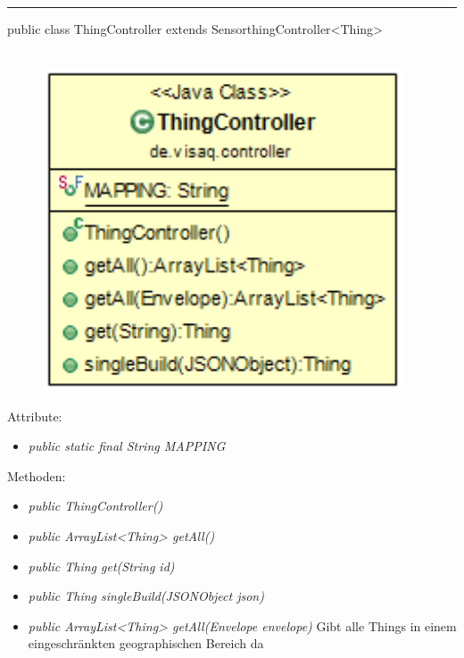 \rule{\textwidth}{0.4pt}
public class ThingController extends SensorthingController<Thing>
\\\\
\begin{minipage}{0.3\textwidth}
    \begin{figure}[H]
        {\centering\includegraphics[width=0.95\textwidth]{media/backend/controller/classes/ThingController.png}}
    \end{figure}
    \end{minipage} \hfill
\begin{minipage}{0.7\textwidth}
\end{minipage}

Attribute:
\begin{itemize}
    \item \emph{public static final String MAPPING} \mappingDescription
\end{itemize}
Methoden:
\begin{itemize}
    \item \emph{public ThingController()}
    \item \emph{public ArrayList<Thing> getAll()}
    \extendsSensorthingController
    \item \emph{public Thing get(String id)}
    \extendsSensorthingController
    \item \emph{public Thing singleBuild(JSONObject json)}
    \extendsSensorthingController
    \item \emph{public ArrayList<Thing> getAll(Envelope envelope)}
    Gibt alle Things in einem eingeschränkten geographischen Bereich da
\end{itemize}

